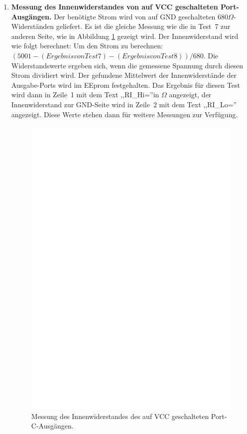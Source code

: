 \begin{enumerate}
\item {\bf Messung des Innenwiderstandes von auf VCC geschalteten Port-Ausg\"angen.}
Der ben\"otigte Strom wird von auf GND geschalteten \(680\Omega\)-Widerst\"anden geliefert.
Es ist die gleiche Messung wie die in Test~7 zur anderen Seite, wie in Abbildung \ref{fig:test8} gezeigt wird.
Der Innenwiderstand wird wie folgt berechnet:
Um den Strom zu berechnen: \((5001 - (Ergebnis von Test 7) - (Ergebnis von Test 8)) / 680\).
Die Widerstandswerte ergeben sich, wenn die gemessene Spannung durch diesen Strom dividiert wird.
Der gefundene Mittelwert der Innenwiderst\"ande der Ausgabe-Ports wird im EEprom festgehalten.
Das Ergebnis f\"ur diesen Test wird dann in Zeile~1 mit dem Text ,,RI\_Hi=''in \(\Omega\) angezeigt, der Innenwiderstand
zur GND-Seite wird in Zeile~2 mit dem Text ,,RI\_Lo='' angezeigt.
Diese Werte stehen dann f\"ur weitere Messungen zur Verf\"ugung.
\begin{figure}[H]
\centering
\includegraphics[]{../FIG/Test8.eps}
\caption{Messung des Innenwiderstandes des auf VCC geschalteten Port-C-Ausg\"angen.}
\label{fig:test8}
\end{figure}


\end{enumerate}
